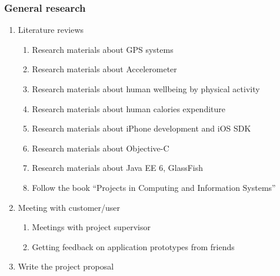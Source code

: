 \documentclass[12pt, a4paper]{report}   %
\begin{document}
\subsubsection{General research}
\begin{enumerate}
	\item Literature reviews
		\begin{enumerate}
			\item Research materials about GPS systems
			\item Research materials about Accelerometer
			\item Research materials about human wellbeing by physical activity
			\item Research materials about human calories expenditure
			\item Research materials about iPhone development and iOS SDK
			\item Research materials about Objective-C
			\item Research materials about Java EE 6, GlassFish  
			\item Follow the book “Projects in Computing and Information Systems”
		\end{enumerate}
	\item Meeting with customer/user
		\begin{enumerate}
			\item Meetings with project supervisor
			\item Getting feedback on application prototypes from friends
		\end{enumerate}
	\item Write the project proposal
\end{enumerate}


\end{document}
